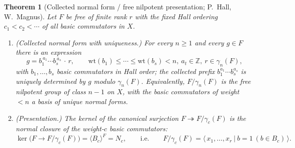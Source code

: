 \documentclass{amsart}
\newtheorem{theorem}{Theorem}
\theoremstyle{definition}
\theoremstyle{remark}
\begin{document}
\begin{theorem}[Collected normal form / free nilpotent presentation; P.~Hall, W.~Magnus]
\label{thm:collection}
Let $F$ be free of finite rank $r$ with the fixed Hall ordering $c_1<c_2<\cdots$ of all basic
commutators in $X$.
\begin{enumerate}
\item[\textup{(NF)}] \textup{(Collected normal form with uniqueness.)} For every $n\ge1$ and
every $g\in F$ there is an expression
\begin{equation}\label{eq:nf}
g=b_{1}^{\,a_1}\cdots b_{s}^{\,a_s}\,\cdot\,r,\qquad
\mathrm{wt}(b_1)\le\cdots\le\mathrm{wt}(b_s)<n,\ a_t\in\mathbb Z,\ r\in\gamma_n(F),
\end{equation}
with $b_1,\dots,b_s$ basic commutators in Hall order; the collected prefix
$b_1^{a_1}\cdots b_s^{a_s}$ is \emph{uniquely determined by $g$ modulo $\gamma_n(F)$}.
Equivalently, $F/\gamma_n(F)$ is the free nilpotent group of class $n-1$ on $X$, with the
basic commutators of weight $<n$ a basis of unique normal forms.
\item[\textup{(PR)}] \textup{(Presentation.)} The kernel of the canonical surjection
$F\twoheadrightarrow F/\gamma_c(F)$ is the normal closure of the weight-$c$ basic commutators:
\[
\ker\!\big(F\to F/\gamma_c(F)\big)=\langle B_c\rangle^{F}=N_c,
\qquad\text{i.e.}\qquad
F/\gamma_c(F)=\big\langle\,x_1,\dots,x_r\ \big|\ b=1\ (b\in B_c)\,\big\rangle .
\]
\end{enumerate}
\end{theorem}
\end{document}
